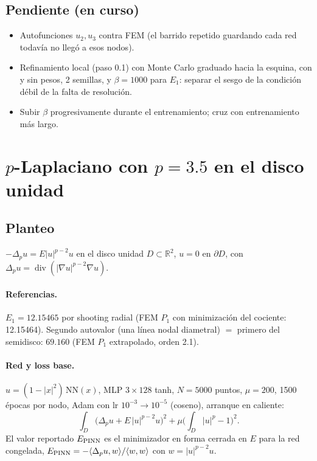 \documentclass[11pt,a4paper]{article}
\begin{document}
\subsection{Pendiente (en curso)}
\begin{itemize}
\item Autofunciones $u_2,u_3$ contra FEM (el barrido repetido guardando cada red todavía no llegó a esos nodos).
\item Refinamiento local (paso 0.1) con Monte Carlo graduado hacia la esquina, con y sin pesos, 2 semillas, y $\beta=1000$
para $E_1$: separar el sesgo de la condición débil de la falta de resolución.
\item Subir $\beta$ progresivamente durante el entrenamiento; cruz con entrenamiento más largo.
\end{itemize}

\section{$p$-Laplaciano con $p=3.5$ en el disco unidad}

\subsection{Planteo}
$-\Delta_pu=E|u|^{p-2}u$ en el disco unidad $D\subset\mathbb R^2$, $u=0$ en $\partial D$, con $\Delta_pu=\operatorname{div}(|\nabla u|^{p-2}\nabla u)$.

\paragraph{Referencias.} $E_1=12.15465$ por shooting radial (FEM $P_1$ con minimización del cociente: 12.15464).
Segundo autovalor (una línea nodal diametral) $=$ primero del semidisco: $69.160$ (FEM $P_1$ extrapolado, orden 2.1).

\paragraph{Red y loss base.} $u=(1-|x|^2)\,\mathrm{NN}(x)$, MLP $3\times128$ tanh, $N=5000$ puntos, $\mu=200$, 1500 épocas por nodo,
Adam con lr $10^{-3}\to10^{-5}$ (coseno), arranque en caliente:
\[
\int_D\big(\Delta_pu+E\,|u|^{p-2}u\big)^2+\mu\Big(\int_D|u|^p-1\Big)^2 .
\]
El valor reportado $E_{\rm PINN}$ es el minimizador en forma cerrada en $E$ para la red congelada,
$E_{\rm PINN}=-\langle\Delta_pu,w\rangle/\langle w,w\rangle$ con $w=|u|^{p-2}u$.
\end{document}

